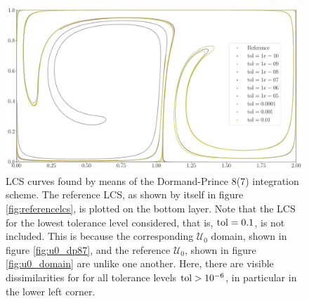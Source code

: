 \begin{figure}[htpb]
    \centering
    \includegraphics[width=0.9\linewidth]{figures/lcs_figures/rkdp87.pdf}
    \caption[LCS curves found by means of the Dormand-Prince 8(7) integration
    scheme]{
        LCS curves found by means of the Dormand-Prince 8(7) integration
        scheme. The reference LCS, as shown by itself in figure
        \ref{fig:referencelcs}, is plotted on the bottom layer. Note that
        the LCS for the lowest tolerance level considered, that is,
        $\textnormal{tol}=0.1$, is not included. This is because the
        corresponding $\mathcal{U}_{0}$ domain, shown in figure
        \ref{fig:u0_dp87}, and the reference $\mathcal{U}_{0}$, shown in figure
        \ref{fig:u0_domain} are unlike one another. Here, there are visible
        dissimilarities for for all tolerance levels $\textnormal{tol}>10^{-6}$,
        in particular in the lower left corner.}
    \label{fig:lcs_rkdp87}
\end{figure}
